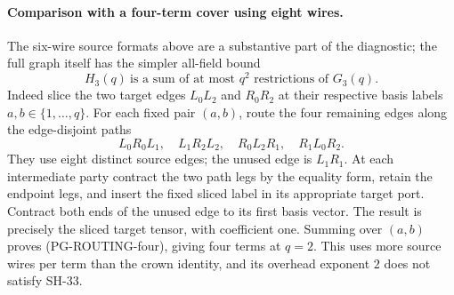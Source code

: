 \paragraph{Comparison with a four-term cover using eight wires.}
The six-wire source formats above are a substantive part of the diagnostic;
the full graph itself has the simpler all-field bound
\[
 H_3(q)\ \text{is a sum of at most }q^2\text{ restrictions of }G_3(q).
 \tag{PG-ROUTING-four}
\]
Indeed slice the two target edges $L_0L_2$ and $R_0R_2$ at their respective
basis labels $a,b\in\{1,\ldots,q\}$. For each fixed pair $(a,b)$, route
the four remaining edges along the edge-disjoint paths
\[
 L_0R_0L_1,\quad L_1R_2L_2,\quad
 R_0L_2R_1,\quad R_1L_0R_2.
\]
They use eight distinct source edges; the unused edge is $L_1R_1$.
At each intermediate party contract the two path legs by the equality
form, retain the endpoint legs, and insert the fixed sliced label in its
appropriate target port. Contract both ends of the unused edge to its
first basis vector. The result is precisely the sliced target tensor,
with coefficient one. Summing over $(a,b)$ proves (PG-ROUTING-four),
giving four terms at $q=2$. This uses more source wires per term than the
crown identity, and its overhead exponent $2$ does not satisfy SH-33.


